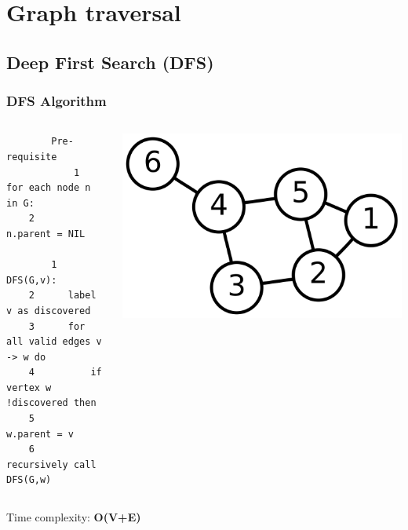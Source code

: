\documentclass[article]{beamer}
\begin{document}
\section{Graph traversal}

\subsection{Deep First Search (DFS)}
\begin{frame}[fragile]
	\frametitle{DFS Algorithm}
	\begin{columns}
		{\tiny
		\begin{lstlisting}
		Pre-requisite
			1     for each node n in G:            
	2         n.parent = NIL	
		
		1  DFS(G,v):
	2      label v as discovered
	3      for all valid edges v -> w do
	4          if vertex w !discovered then
	5               w.parent = v
	6              recursively call DFS(G,w)
		\end{lstlisting}
		}
			\includegraphics[scale=0.07]{./figures/graph_dfs_bfs.png}
	\end{columns}
	\begin{flushright} 
	Time complexity: \textbf{O(V+E)}
	\end{flushright}
\end{frame}
\end{document}
